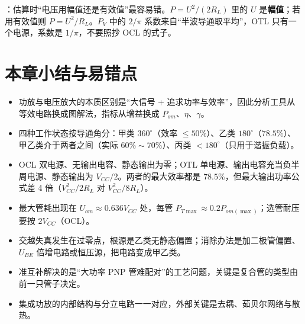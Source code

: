 ：估算时“电压用幅值还是有效值”最容易错。$P=U^2/(2R_L)$ 里的 $U$ 是\textbf{幅值}；若用有效值则 $P=U^2/R_L$。$P_V$ 中的 $2/\pi$ 系数来自“半波导通取平均”，OTL 只有一个电源，系数是 $1/\pi$，不要照抄 OCL 的式子。

\section{本章小结与易错点}
\begin{itemize}
    \item 功放与电压放大的本质区别是“大信号 + 追求功率与效率”，因此分析工具从等效电路换成图解法，指标从增益换成 $P_{om}$、$\eta$、$\gamma$。
    \item 四种工作状态按导通角分：甲类 $360^\circ$（效率 $\le50\%$）、乙类 $180^\circ$（$78.5\%$）、甲乙类介于两者之间（实际 $60\%\sim70\%$）、丙类 $<180^\circ$（只用于谐振负载）。
    \item OCL 双电源、无输出电容、静态输出为零；OTL 单电源、输出电容充当负半周电源、静态输出为 $V_{CC}/2$。两者的最大效率都是 $78.5\%$，但最大输出功率公式差 4 倍（$V_{CC}^2/2R_L$ 对 $V_{CC}^2/8R_L$）。
    \item 最大管耗出现在 $U_{om}\approx0.636V_{CC}$ 处，每管 $P_{T\max}\approx0.2P_{om(\max)}$；选管耐压要按 $2V_{CC}$（OCL）。
    \item 交越失真发生在过零点，根源是乙类无静态偏置；消除办法是加二极管偏置、$U_{BE}$ 倍增电路或恒压源，把电路变成甲乙类。
    \item 准互补解决的是“大功率 PNP 管难配对”的工艺问题，关键是复合管的类型由前一只管子决定。
    \item 集成功放的内部结构与分立电路一一对应，外部关键是去耦、茹贝尔网络与散热。
\end{itemize}
